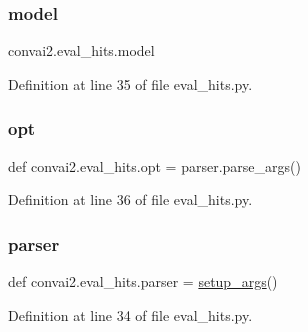 \subsubsection{\texorpdfstring{model}{model}}
{\footnotesize\ttfamily convai2.\+eval\+\_\+hits.\+model}



Definition at line 35 of file eval\+\_\+hits.\+py.

\mbox{\label{namespaceconvai2_1_1eval__hits_a97e612a68f87f99ba3bba783314069f7}} 
\subsubsection{\texorpdfstring{opt}{opt}}
{\footnotesize\ttfamily def convai2.\+eval\+\_\+hits.\+opt = parser.\+parse\+\_\+args()}



Definition at line 36 of file eval\+\_\+hits.\+py.

\mbox{\label{namespaceconvai2_1_1eval__hits_a4efddcdcd89a045f5533c6da390fd86b}} 
\subsubsection{\texorpdfstring{parser}{parser}}
{\footnotesize\ttfamily def convai2.\+eval\+\_\+hits.\+parser = \hyperlink{namespaceconvai2_1_1eval__hits_a3c68be2e1a546ad88843f387bf865deb}{setup\+\_\+args}()}



Definition at line 34 of file eval\+\_\+hits.\+py.

